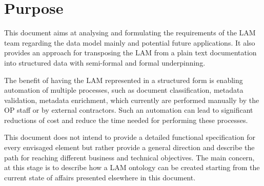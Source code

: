 \hypertarget{ariaid-title1}{%
\section{Purpose}\label{ariaid-title1}}

This document aims at analysing and formulating the requirements of the
LAM team regarding the data model mainly and potential future
applications. It also provides an approach for transposing the LAM from
a plain text documentation into structured data with semi-formal and
formal underpinning.

The benefit of having the LAM represented in a structured form is
enabling automation of multiple processes, such as document
classification, metadata validation, metadata enrichment, which
currently are performed manually by the OP staff or by external
contractors. Such an automation can lead to significant reductions of
cost and reduce the time needed for performing these processes.

This document does not intend to provide a detailed functional
specification for every envisaged element but rather provide a general
direction and describe the path for reaching different business and
technical objectives. The main concern, at this stage is to describe how
a LAM ontology can be created starting from the current state of affairs
presented elsewhere in this document.
